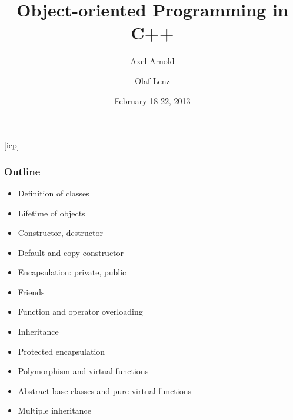 \documentclass{slides}
\begin{document}
\graphicspath{{figures/}}

\title[Object-oriented Programming in C++]{\Large Object-oriented
  Programming in C++}

\author[A. Arnold and O. Lenz]{Axel Arnold \and Olaf Lenz} 
\date{February 18-22, 2013}

\begin{frame}
  \titlepage
\end {frame}
[icp]

\begin{frame}
  \frametitle{Outline}
  \begin{itemize}
  \item Definition of classes
  \item Lifetime of objects
  \item Constructor, destructor
  \item Default and copy constructor
  \item Encapsulation: private, public
  \item Friends
  \item Function and operator overloading
  \item Inheritance
  \item Protected encapsulation
  \item Polymorphism and virtual functions
  \item Abstract base classes and pure virtual functions
  \item Multiple inheritance
  \end{itemize}
\end{frame}
\end{document}
